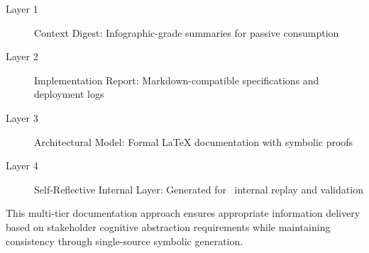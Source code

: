 \documentclass[12pt,twoside,openright]{report}
\begin{document}
\begin{description}
\item[Layer 1] Context Digest: Infographic-grade summaries for passive consumption
\item[Layer 2] Implementation Report: Markdown-compatible specifications and deployment logs  
\item[Layer 3] Architectural Model: Formal LaTeX documentation with symbolic proofs
\item[Layer 4] Self-Reflective Internal Layer: Generated for \obiai\ internal replay and validation
\end{description}

This multi-tier documentation approach ensures appropriate information delivery based on stakeholder cognitive abstraction requirements while maintaining consistency through single-source symbolic generation.

\printbibliography
\end{document}
